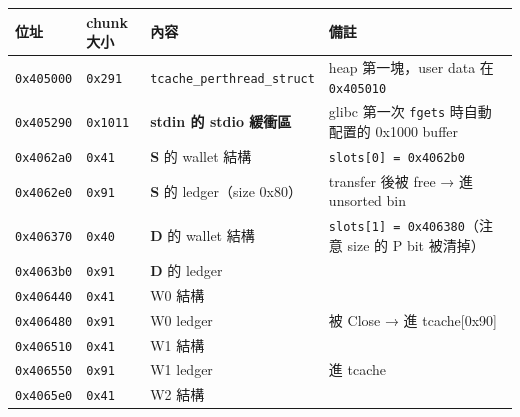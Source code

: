 \documentclass[10pt,a4paper]{article}
\newcounter{none}
\begin{document}
{\def\LTcaptype{none} %
\begin{longtable}[]{@{}
  >{\raggedright\arraybackslash}p{}
  >{\raggedright\arraybackslash}p{}
  >{\raggedright\arraybackslash}p{}
  >{\raggedright\arraybackslash}p{}@{}}
\toprule\noalign{}
\begin{minipage}[b]{\linewidth}\raggedright
位址
\end{minipage} & \begin{minipage}[b]{\linewidth}\raggedright
chunk 大小
\end{minipage} & \begin{minipage}[b]{\linewidth}\raggedright
內容
\end{minipage} & \begin{minipage}[b]{\linewidth}\raggedright
備註
\end{minipage} \\
\midrule\noalign{}
\endhead
\bottomrule\noalign{}
\endlastfoot
\texttt{0x405000} & \texttt{0x291} & \texttt{tcache\_\allowbreak{}perthread\_\allowbreak{}struct}
& heap 第一塊，user data 在 \texttt{0x405010} \\
\texttt{0x405290} & \texttt{0x1011} & \textbf{stdin 的 stdio 緩衝區} &
glibc 第一次 \texttt{fgets} 時自動配置的 0x1000 buffer \\
\texttt{0x4062a0} & \texttt{0x41} & \textbf{S} 的 wallet 結構 &
\texttt{slots{[}0{]}\ \allowbreak{}=\ \allowbreak{}0x4062b0} \\
\texttt{0x4062e0} & \texttt{0x91} & \textbf{S} 的 ledger（size 0x80） &
transfer 後被 free → 進 unsorted bin \\
\texttt{0x406370} & \texttt{0x40} & \textbf{D} 的 wallet 結構 &
\texttt{slots{[}1{]}\ \allowbreak{}=\ \allowbreak{}0x406380}（注意 size 的 P bit 被清掉） \\
\texttt{0x4063b0} & \texttt{0x91} & \textbf{D} 的 ledger & \\
\texttt{0x406440} & \texttt{0x41} & W0 結構 & \\
\texttt{0x406480} & \texttt{0x91} & W0 ledger & 被 Close → 進
tcache{[}0x90{]} \\
\texttt{0x406510} & \texttt{0x41} & W1 結構 & \\
\texttt{0x406550} & \texttt{0x91} & W1 ledger & 進 tcache \\
\texttt{0x4065e0} & \texttt{0x41} & W2 結構 & \\

\end{longtable}}
\end{document}
